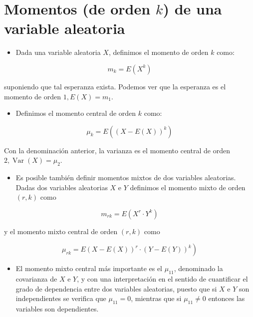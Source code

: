\documentclass[
  a4paper,
  DIV=11,
  numbers=noendperiod]{scrreprt}
\providecommand{\tightlist}{%
  \setlength{\itemsep}{0pt}\setlength{\parskip}{0pt}}\usepackage{longtable,booktabs,array}
\begin{document}
\section{\texorpdfstring{Momentos (de orden \(k\)) de una variable
aleatoria}{Momentos (de orden k) de una variable aleatoria}}\label{momentos-de-orden-k-de-una-variable-aleatoria}

\begin{itemize}
\tightlist
\item
  Dada una variable aleatoria \(X\), definimos el momento de orden \(k\)
  como:
\end{itemize}

\[
m_{k}=E\left(X^{k}\right)
\]

suponiendo que tal esperanza exista. Podemos ver que la esperanza es el
momento de orden \(1, E(X)=m_{1}\).

\begin{itemize}
\tightlist
\item
  Definimos el momento central de orden \(k\) como:
\end{itemize}

\[
\mu_{k}=E\left((X-E(X))^{k}\right)
\]

Con la denominación anterior, la varianza es el momento central de orden
\(2, \operatorname{Var}(X)=\mu_{2}\).

\begin{itemize}
\tightlist
\item
  Es posible también definir momentos mixtos de dos variables
  aleatorias. Dadas dos variables aleatorias \(X\) e \(Y\) definimos el
  momento mixto de orden \((r, k)\) como
\end{itemize}

\[
m_{r k}=E\left(X^{r} \cdot Y^{k}\right)
\]

y el momento mixto central de orden \((r, k)\) como

\[
\left.\mu_{r k}=E(X-E(X))^{r} \cdot(Y-E(Y))^{k}\right)
\]

\begin{itemize}
\tightlist
\item
  El momento mixto central más importante es el \(\mu_{11}\), denominado
  la covarianza de \(X\) e \(Y\), y con una interpretación en el sentido
  de cuantificar el grado de dependencia entre dos variables aleatorias,
  puesto que si \(X\) e \(Y\) son independientes se verifica que
  \(\mu_{11}=0\), mientras que si \(\mu_{11} \neq 0\) entonces las
  variables son dependientes.
\end{itemize}
\end{document}
